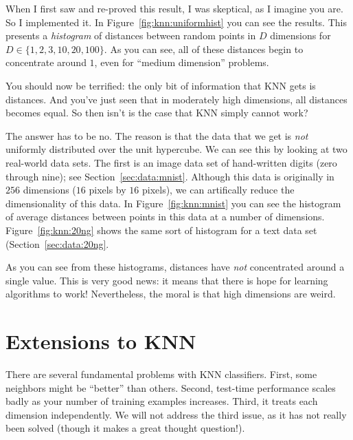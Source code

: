 
When I first saw and re-proved this result, I was skeptical, as I
imagine you are.  So I implemented it.  In
Figure~\ref{fig:knn:uniformhist} you can see the results.  This
presents a \emph{histogram} of distances between random points in $D$
dimensions for $D \in \{1,2,3,10,20,100\}$.  As you can see, all of
these distances begin to concentrate around $1$, even for ``medium
dimension'' problems.

You should now be terrified: the only bit of information that KNN gets
is distances.  And you've just seen that in moderately high dimensions,
all distances becomes equal.  So then isn't is the case that KNN
simply cannot work?



The answer has to be no.  The reason is that the data that we get is
\emph{not} uniformly distributed over the unit hypercube.  We can see
this by looking at two real-world data sets.  The first is an image
data set of hand-written digits (zero through nine); see
Section~\ref{sec:data:mnist}.  Although this data is originally in
$256$ dimensions ($16$ pixels by $16$ pixels), we can artifically
reduce the dimensionality of this data.  In Figure~\ref{fig:knn:mnist}
you can see the histogram of average distances between points in this
data at a number of dimensions.  Figure~\ref{fig:knn:20ng} shows the
same sort of histogram for a text data set
(Section~\ref{sec:data:20ng}.

As you can see from these histograms, distances have \emph{not}
concentrated around a single value.  This is very good news: it means
that there is hope for learning algorithms to work!  Nevertheless, the
moral is that high dimensions are weird.


\section{Extensions to KNN}

There are several fundamental problems with KNN classifiers.  First,
some neighbors might be ``better'' than others.  Second, test-time
performance scales badly as your number of training examples
increases.  Third, it treats each dimension independently.  We will
not address the third issue, as it has not really been solved (though
it makes a great thought question!).

